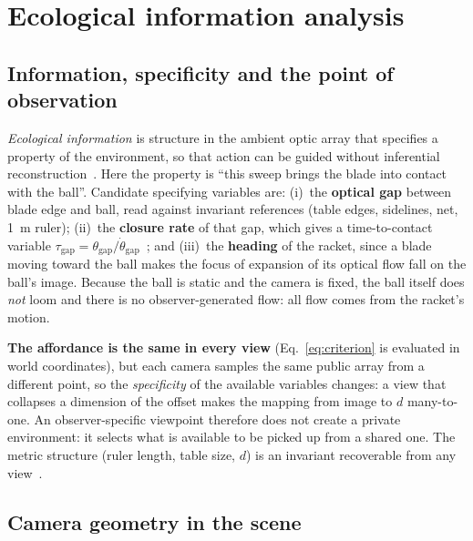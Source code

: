 \section{Ecological information analysis}\label{sec:ecological}

\subsection{Information, specificity and the point of observation}

\emph{Ecological information} is structure in the ambient optic array that specifies a property of the environment, so that action can be guided without inferential reconstruction~\cite{gibson1979}. Here the property is ``this sweep brings the blade into contact with the ball''. Candidate specifying variables are: (i)~the \textbf{optical gap} between blade edge and ball, read against invariant references (table edges, sidelines, net, \SI{1}{\meter} ruler); (ii)~the \textbf{closure rate} of that gap, which gives a time-to-contact variable $\tau_{\mathrm{gap}}=\theta_{\mathrm{gap}}/\dot\theta_{\mathrm{gap}}$~\cite{lee1976}; and (iii)~the \textbf{heading} of the racket, since a blade moving toward the ball makes the focus of expansion of its optical flow fall on the ball's image. Because the ball is static and the camera is fixed, the ball itself does \emph{not} loom and there is no observer-generated flow: all flow comes from the racket's motion.

\textbf{The affordance is the same in every view} (Eq.~\eqref{eq:criterion} is evaluated in world coordinates), but each camera samples the same public array from a different point, so the \emph{specificity} of the available variables changes: a view that collapses a dimension of the offset makes the mapping from image to $d$ many-to-one. An observer-specific viewpoint therefore does not create a private environment: it selects what is available to be picked up from a shared one. The metric structure (ruler length, table size, $d$) is an invariant recoverable from any view~\cite{gibson1979}.

\subsection{Camera geometry in the scene}

